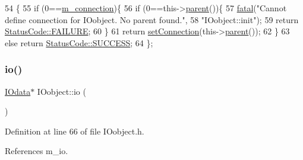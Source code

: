 \begin{DoxyCode}
54                             \{
55     \textcolor{keywordflow}{if} (0==\hyperlink{classElement_abe3de7a5dbbc9a6dd2d7e012e5fdb266}{m\_connection})\{
56       \textcolor{keywordflow}{if} (0==this->\hyperlink{classHierarchy_a1c7bec8257e717f9c1465e06ebf845fc}{parent}())\{
57         \hyperlink{classObject_aad5a16aac7516ce65bd5ec02ab07fc80}{fatal}(\textcolor{stringliteral}{"Cannot define connection for IOobject. No parent found."},
58             \textcolor{stringliteral}{"IOobject::init"});
59           \textcolor{keywordflow}{return} \hyperlink{classStatusCode_a6f565cbeadc76d14c72f047e5e85eb4ba3da73d4c469762eb9d3c960368252b26}{StatusCode::FAILURE};
60       \}
61       \textcolor{keywordflow}{return} \hyperlink{classElement_ab476b4b1df5954141ceb14f072433b89}{setConnection}(this->\hyperlink{classHierarchy_a1c7bec8257e717f9c1465e06ebf845fc}{parent}());
62     \}
63     \textcolor{keywordflow}{else} \textcolor{keywordflow}{return} \hyperlink{classStatusCode_a6f565cbeadc76d14c72f047e5e85eb4badd0da38d3ba0d922efd1f4619bc37ad8}{StatusCode::SUCCESS};
64   \};
\end{DoxyCode}
\mbox{\label{classIOobject_af04fb94137c3d86849f478ac5afab5d1}} 
\subsubsection{\texorpdfstring{io()}{io()}}
{\footnotesize\ttfamily \hyperlink{classIOdata}{I\+Odata}$\ast$ I\+Oobject\+::io (\begin{DoxyParamCaption}{ }\end{DoxyParamCaption})\hspace{0.3cm}{\ttfamily [inline]}}



Definition at line 66 of file I\+Oobject.\+h.



References m\+\_\+io.



